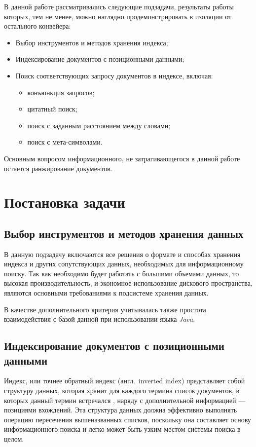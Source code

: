 \documentclass[12pt]{article}
\begin{document}
В данной работе рассматривались следующие подзадачи, результаты работы
которых, тем не менее, можно наглядно продемонстрировать в изоляции от 
остального конвейера:
\begin{itemize}
\item Выбор инструментов и методов хранения индекса;
\item Индексирование документов с позиционными данными;
\item Поиск соответствующих запросу документов в индексе, включая:
    \begin{itemize}
        \item конъюнкция запросов;
        \item цитатный поиск;
        \item поиск с заданным расстоянием между словами;
        \item поиск с мета-символами.
    \end{itemize}
\end{itemize}

Основным вопросом информационного, не затрагивающегося в данной работе остается ранжирование документов.

\section{Постановка задачи}
\subsection{Выбор инструментов и методов хранения данных}
В данную подзадачу включаются все решения о формате и способах хранения
индекса и других сопутствующих данных, необходимых для информационному поиску.
Так как необходимо будет работать с большими объемами данных, то высокая 
производительность, и экономное использование дискового пространства, 
являются основными требованиями к подсистеме хранения данных.

В качестве дополнительного критерия учитывалась также простота взаимодействия с 
базой данной при использовании языка \emph{Java}.

\subsection{Индексирование документов с позиционными данными}
Индекс, или точнее обратный индекс (англ.~inverted index) представляет собой структуру
данных, которая хранит для каждого термина список документов, в которых данный термин встречался
, наряду с дополнительной информацией --- позициями вхождений. 
Эта структура данных должна эффективно выполнять операцию пересечения вышеназванных списков, 
поскольку она составляет основу информационного поиска и легко может быть
узким местом системы поиска в целом.
\end{document}
